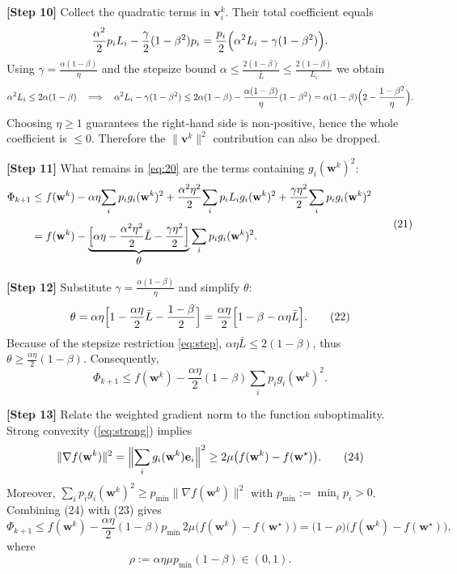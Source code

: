 \documentclass[11pt]{article}
\begin{document}
\noindent\textbf{[Step 10]}   Collect the quadratic terms in $\mathbf v^{k}_{i}$.
Their total coefficient equals
\[
\frac{\alpha^{2}}{2}p_iL_i -\frac{\gamma}{2}(1-\beta^{2})p_i
= \frac{p_i}{2}\Bigl(\alpha^{2}L_i-\gamma(1-\beta^{2})\Bigr).
\]
Using $\gamma=\frac{\alpha(1-\beta)}{\eta}$ and the stepsize bound
$\alpha\le\frac{2(1-\beta)}{\bar L}\le\frac{2(1-\beta)}{L_i}$ we obtain
\[
\alpha^{2}L_i\le 2\alpha(1-\beta)
\quad\Longrightarrow\quad
\alpha^{2}L_i-\gamma(1-\beta^{2})
\le 2\alpha(1-\beta)-\frac{\alpha(1-\beta)}{\eta}(1-\beta^{2})
= \alpha(1-\beta)\Bigl(2-\frac{1-\beta^{2}}{\eta}\Bigr).
\]
Choosing $\eta\ge1$ guarantees the right‑hand side is non‑positive,
hence the whole coefficient is $\le0$.  Therefore the $\|\mathbf v^{k}\|^{2}$
contribution can also be dropped.

\noindent\textbf{[Step 11]}   What remains in \eqref{eq:20} are the terms
containing $g_i(\mathbf w^{k})^{2}$:
\[
\begin{aligned}
\Phi_{k+1}
\le &\; f(\mathbf w^{k})
   -\alpha\eta\!\sum_{i}p_i g_i(\mathbf w^{k})^{2}
   +\frac{\alpha^{2}\eta^{2}}{2}\!\sum_{i}p_i L_i g_i(\mathbf w^{k})^{2}
   +\frac{\gamma\eta^{2}}{2}\!\sum_{i}p_i g_i(\mathbf w^{k})^{2}\\[4pt]
=&\; f(\mathbf w^{k})
   -\underbrace{\Bigl[\alpha\eta-\frac{\alpha^{2}\eta^{2}}{2}\bar L
                -\frac{\gamma\eta^{2}}{2}\Bigr]}_{\displaystyle\theta}
      \sum_{i}p_i g_i(\mathbf w^{k})^{2}.
\end{aligned}
\tag{21}
\]

\noindent\textbf{[Step 12]}   Substitute $\gamma=\frac{\alpha(1-\beta)}{\eta}$ and
simplify $\theta$:
\[
\theta
= \alpha\eta\Bigl[1-\frac{\alpha\eta}{2}\bar L-\frac{1-\beta}{2}\Bigr]
= \frac{\alpha\eta}{2}\Bigl[1-\beta-\alpha\eta\bar L\Bigr].
\tag{22}
\]
Because of the stepsize restriction \eqref{eq:step},
$\alpha\eta\bar L\le 2(1-\beta)$, thus $\theta\ge\frac{\alpha\eta}{2}(1-\beta)$.
Consequently,
\[
\Phi_{k+1}\le f(\mathbf w^{k})-\frac{\alpha\eta}{2}(1-\beta)
         \sum_{i}p_i g_i(\mathbf w^{k})^{2}.
\tag{23}
\]

\noindent\textbf{[Step 13]}   Relate the weighted gradient norm to the
function suboptimality.  Strong convexity (\ref{eq:strong}) implies
\[
\|\nabla f(\mathbf w^{k})\|^{2}
= \Bigl\|\sum_{i}g_i(\mathbf w^{k})\mathbf e_i\Bigr\|^{2}
\ge 2\mu\bigl(f(\mathbf w^{k})-f(\mathbf w^{\star})\bigr).
\tag{24}
\]
Moreover, $\sum_{i}p_i g_i(\mathbf w^{k})^{2}\ge p_{\min}\|\nabla f(\mathbf w^{k})\|^{2}$
with $p_{\min}:=\min_i p_i>0$.
Combining (24) with (23) gives
\[
\Phi_{k+1}
\le f(\mathbf w^{k})-\frac{\alpha\eta}{2}(1-\beta)p_{\min}\,
      2\mu\bigl(f(\mathbf w^{k})-f(\mathbf w^{\star})\bigr)
= \bigl(1-\rho\bigr)\bigl(f(\mathbf w^{k})-f(\mathbf w^{\star})\bigr),
\tag{25}
\]
where
\[
\rho:=\alpha\eta\mu p_{\min}(1-\beta)\in(0,1).
\tag{26}
\]
\end{document}
